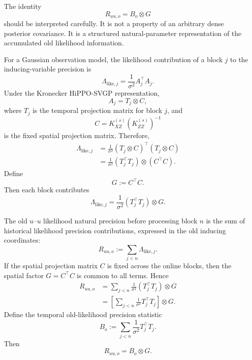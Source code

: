 \documentclass[12pt]{article}
\begin{document}
The identity
\begin{equation}
    R_{uu,o}=B_o\otimes G
\end{equation}
should be interpreted carefully. It is not a property of an arbitrary
dense posterior covariance. It is a structured natural-parameter
representation of the accumulated old likelihood information.

For a Gaussian observation model, the likelihood contribution of a block
\(j\) to the inducing-variable precision is
\begin{equation}
    \Lambda_{\mathrm{like},j}
    =
    \frac{1}{\sigma^2}A_j^\top A_j.
    \label{eq:app_likelihood_precision}
\end{equation}
Under the Kronecker HiPPO-SVGP representation,
\begin{equation}
    A_j=T_j\otimes C,
    \label{eq:app_Aj_kron}
\end{equation}
where \(T_j\) is the temporal projection matrix for block \(j\), and
\begin{equation}
    C=K_{XZ}^{(s)}\left(K_{ZZ}^{(s)}\right)^{-1}
\end{equation}
is the fixed spatial projection matrix. Therefore,
\begin{align}
    \Lambda_{\mathrm{like},j}
    &=
    \frac{1}{\sigma^2}
    (T_j\otimes C)^\top(T_j\otimes C)                         \\
    &=
    \frac{1}{\sigma^2}
    (T_j^\top T_j)\otimes(C^\top C).
    \label{eq:app_likelihood_precision_kron}
\end{align}
Define
\begin{equation}
    G:=C^\top C.
\end{equation}
Then each block contributes
\begin{equation}
    \Lambda_{\mathrm{like},j}
    =
    \frac{1}{\sigma^2}
    (T_j^\top T_j)\otimes G.
\end{equation}

The old $u$--$u$ likelihood natural precision before processing block \(n\)
is the sum of historical likelihood precision contributions, expressed in the old
inducing coordinates:
\begin{equation}
    R_{uu,o}
    :=
    \sum_{j<n}
    \Lambda_{\mathrm{like},j}.
\end{equation}
If the spatial projection matrix \(C\) is fixed across the online blocks,
then the spatial factor \(G=C^\top C\) is common to all terms. Hence
\begin{align}
    R_{uu,o}
    &=
    \sum_{j<n}
    \frac{1}{\sigma^2}
    (T_j^\top T_j)\otimes G                                  \\
    &=
    \left[
        \sum_{j<n}
        \frac{1}{\sigma^2}
        T_j^\top T_j
    \right]\otimes G.
\end{align}
Define the temporal old-likelihood precision statistic
\begin{equation}
    B_o
    :=
    \sum_{j<n}
    \frac{1}{\sigma^2}
    T_j^\top T_j.
    \label{eq:app_Bo_definition}
\end{equation}
Then
\begin{equation}
    R_{uu,o}=B_o\otimes G.
    \label{eq:app_Ruu_Bo_G}
\end{equation}
\end{document}
